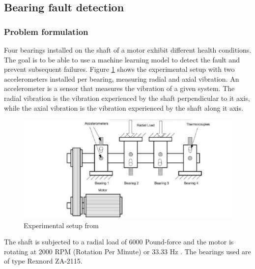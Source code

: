 \documentclass[11pt, oneside]{article}   	%
\begin{document}
\subsection{Bearing fault detection}
\subsubsection{Problem formulation}
Four bearings installed on the shaft of a motor exhibit different health conditions. The goal is to be able to use a machine learning model to detect the fault and prevent subsequent failures.
Figure \ref{fig:exp} shows the experimental setup with two accelerometers installed per bearing, measuring radial and axial vibration. An accelerometer is a sensor that measures the vibration of a given system. The radial vibration is the vibration experienced by the shaft perpendicular to it axis, while the axial vibration is the vibration experienced by the shaft along it axis.
\begin{figure}[H] %
   \centering
   \includegraphics[width=5in]{thesis-pictures/experiment} 
   \caption{Experimental setup from \cite{hai}}
   \label{fig:exp}
\end{figure}
\justify
The shaft is subjected to a radial load of 6000 Pound-force and the motor is rotating at 2000 RPM (Rotation Per Minute) or 33.33 Hz \cite{ims}. The bearings used are of type Rexnord ZA-2115.
\end{document}
